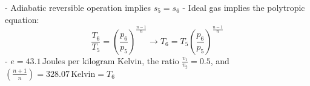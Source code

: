 - Adiabatic reversible operation implies \( s_5 = s_6 \)
- Ideal gas implies the polytropic equation:
  \[
  \frac{T_6}{T_5} = \left( \frac{p_6}{p_5} \right)^{\frac{n-1}{n}} \rightarrow T_6 = T_5 \left( \frac{p_6}{p_5} \right)^{\frac{n-1}{n}}
  \]
- \( e = 43.1 \, \text{Joules per kilogram Kelvin} \), the ratio \( \frac{v_1}{v_2} = 0.5 \), and \( \left( \frac{n+1}{n} \right) = 328.07 \, \text{Kelvin} = T_6 \)